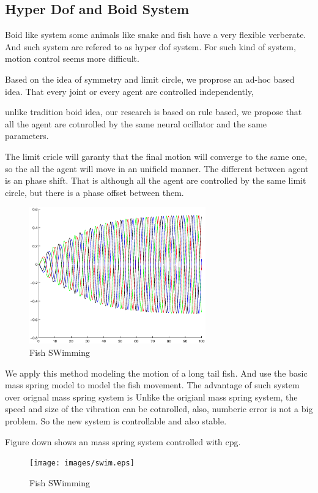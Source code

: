 \subsection{Hyper Dof and Boid System}

Boid like system
some animals like snake and fish have a very flexible verberate. 
And such system are refered to as hyper dof system.
For such kind of system, motion control seems more difficult.

Based on the idea of symmetry and limit circle, we proprose an ad-hoc based idea.
That every joint or every agent are controlled independently,

unlike tradition boid idea,
our research is based on rule based,
 we propose that all the agent are cotnrolled by the same neural ocillator and the same parameters.

The limit cricle will garanty that the final motion will converge to the same one,
so the all the agent will move in an unifield manner.
The different between agent is an phase shift.
That is although all the agent are controlled by the same limit circle, but there is a phase offset between them.
\begin{figure}[ht]
  \centering
  \includegraphics[width=3in]{images/phaseShift.eps}
  \caption{Fish SWimming}
\end{figure}


We apply this method modeling the motion of a long tail fish.
And use the basic mass spring model to model the fish movement.
The advantage of such system over orignal mass spring system is 
Unlike the origianl mass spring system, the speed and size of the vibration can be cotnrolled,
also, numberic error is not a big problem.
So the new system is controllable and also stable.

Figure down shows an mass spring system controlled with cpg.
\begin{figure}[ht]
  \centering
  \texttt{[image: images/swim.eps]}
  \caption{Fish SWimming}
\end{figure}